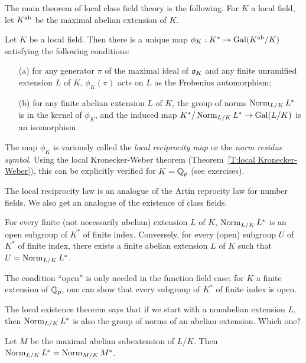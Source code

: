 
The main theorem of local class field theory is the following. For $K$
a local field, let $K^{\operatorname{ab}}$ be the maximal abelian extension of $K$.
\begin{theorem} \label{T:local reciprocity}
  Let $K$ be a local field. Then there is a unique map
$\phi_K: K^* \to \operatorname{Gal}(K^{\operatorname{ab}}/K)$ satisfying the following conditions:
\begin{enumerate}
\item[(a)] for any generator $\pi$ of the maximal ideal of $\mathfrak{o}_K$
and any finite unramified extension $L$ of $K$, $\phi_K(\pi)$ acts on
$L$ as the Frobenius automorphism;
\item[(b)] for any finite abelian extension $L$ of $K$, the group of
norms $\operatorname{Norm}_{L/K} L^*$ is in the kernel of $\phi_K$, and the induced
map $K^*/\operatorname{Norm}_{L/K} L^* \to \operatorname{Gal}(L/K)$ is an isomorphism.
\end{enumerate}
\end{theorem}
The map $\phi_K$ is variously called the \emph{local reciprocity map} or the
\emph{norm residue symbol}.
Using the local Kronecker-Weber theorem (Theorem~\ref{T:local Kronecker-Weber}), this can be explicitly verified
for $K=\mathbb{Q}_p$ (see exercises).

The local reciprocity law is an analogue of the Artin reprocity law for
number fields. We also get an analogue of the existence of class fields.
\begin{theorem} \label{T:local existence}
For every finite (not necessarily abelian) extension $L$ of $K$,
$\operatorname{Norm}_{L/K} L^*$ is an open subgroup of $K^*$ of finite index.
Conversely,
for every (open) subgroup $U$ of $K^*$ of finite index, there exists a
finite abelian extension $L$ of $K$ such that $U = \operatorname{Norm}_{L/K} L^*$.
\end{theorem}
The condition ``open'' is only needed in the function field case; for
$K$ a finite extension of $\mathbb{Q}_p$, one can show that every subgroup
of $K^*$ of finite index is open.

The local existence theorem says that if we start with a nonabelian extension $L$,
then $\operatorname{Norm}_{L/K} L^*$ is also the group of norms of an abelian extension.
Which one?
\begin{theorem} \label{T:norm limitation}
Let $M$ be the maximal abelian subextension of $L/K$. Then
$\operatorname{Norm}_{L/K} L^* = \operatorname{Norm}_{M/K} M^*$.
\end{theorem}

